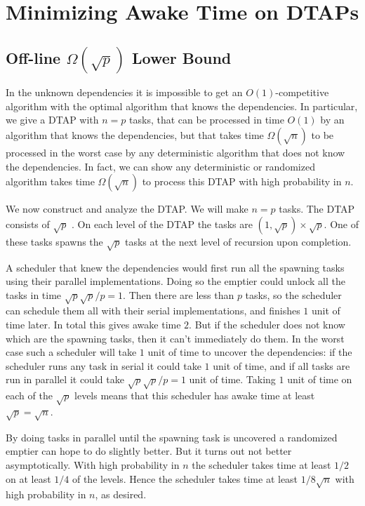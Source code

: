 \section{Minimizing Awake Time on DTAPs} 
\label{sec:awaketimeDeps}

\subsection{Off-line $\Omega(\sqrt{p})$ Lower Bound}
In the unknown dependencies it is impossible to get an
$O(1)$-competitive algorithm with the optimal algorithm that
knows the dependencies.
In particular, we give a DTAP with $n=p$ tasks, that can be
processed in time $O(1)$ by an algorithm that knows the
dependencies, but that takes time
$\Omega(\sqrt{n})$ to be processed in the worst
case by any deterministic algorithm that does not know the
dependencies.
In fact, we can show any deterministic or randomized algorithm
takes time $\Omega(\sqrt{n})$ to process this DTAP with high
probability in $n$.

We now construct and analyze the DTAP. We will make $n=p$ tasks.
The DTAP consists of $\sqrt{p}$ . On each level of
the DTAP the tasks are $(1,\sqrt{p})\times \sqrt{p}$. One of
these tasks spawns the $\sqrt{p}$ tasks at the next level of
recursion upon completion.

A scheduler that knew the dependencies would first run all the
spawning tasks using their parallel implementations. Doing so the
emptier could unlock all the tasks in time $\sqrt{p} \sqrt{p} / p
= 1$. Then there are less than $p$ tasks, so the scheduler can
schedule them all with their serial implementations, and finishes
$1$ unit of time later. In total this gives awake time $2$.
But if the scheduler does not know which are the spawning tasks,
then it can't immediately do them. In the worst case such a
scheduler will take $1$ unit of time to uncover the dependencies:
if the scheduler runs any task in serial it could take $1$ unit
of time, and if all tasks are run in parallel it could take
$\sqrt{p}\sqrt{p} / p = 1$ unit of time.
Taking $1$ unit of time on each of the $\sqrt{p}$ levels means
that this scheduler has awake time at least $\sqrt{p} = \sqrt{n}$.

By doing tasks in parallel until the spawning task is uncovered a
randomized emptier can hope to do slightly better. But it turns
out not better asymptotically.
With high probability in $n$ the scheduler takes time at least
$1/2$ on at least $1/4$ of the levels.
Hence the scheduler takes time at least $1/8 \sqrt{n}$ with high
probability in $n$, as desired.

